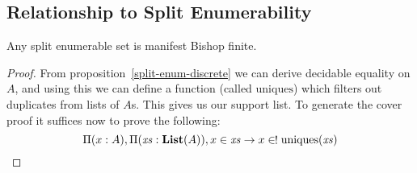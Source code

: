 \subsection{Relationship to Split Enumerability}
\begin{rm-theorem} \label{split-enum-to-manifest-bishop}
  Any split enumerable set is manifest Bishop finite.
\end{rm-theorem}
\begin{proof}
  From proposition~\ref{split-enum-discrete} we can derive decidable equality on
  \(A\), and using this we can define a function (called \(\text{uniques}\)) which filters
  out duplicates from lists of \(A\)s.
  This gives us our support list.
  To generate the cover proof it suffices now to prove the following:
  \begin{equation}
    \Pi {(x : A)} , \Pi {(\mathit{xs} : \textbf{List}(A))} , x \in \mathit{xs} \rightarrow x \inunique \text{uniques}(\mathit{xs})
  \end{equation}
\end{proof}
